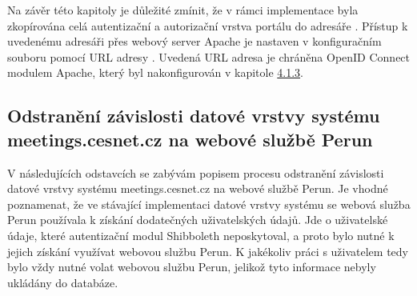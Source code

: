 \documentclass[
  printed, %
  twoside, %
  table,   %
  nolof,     %
  nolot,     %
]{fithesis3}
\begin{document}
\par




Na závěr této kapitoly je důležité zmínit, že v rámci implementace byla zkopírována celá autentizační a autorizační vrstva portálu  do adresáře . Přístup k uvedenému adresáři přes webový server Apache je nastaven v konfiguračním souboru  pomocí URL adresy . Uvedená URL adresa je chráněna OpenID Connect modulem Apache, který byl nakonfigurován v kapitole \hyperref[sec:mod-conf]{4.1.3}.

\subsection[Odstranění závislosti datové vrstvy systému\break meetings.cesnet.cz na webové službě Perun]{Odstranění závislosti datové vrstvy systému meetings.cesnet.cz na webové službě Perun}
\label{zpracovaniAUlozeniPerun}
V následujících odstavcích se zabývám popisem procesu odstranění závislosti datové vrstvy systému meetings.cesnet.cz na webové službě Perun. Je vhodné poznamenat, že ve stávající implementaci datové vrstvy systému  se webová služba Perun používala k získání dodatečných uživatelských údajů. Jde o uživatelské údaje, které autentizační modul Shibboleth neposkytoval, a proto bylo nutné k jejich získání využívat webovou službu Perun. K jakékoliv práci s uživatelem tedy bylo vždy nutné volat webovou službu Perun, jelikož tyto informace nebyly ukládány do databáze. 

\par 
\end{document}
